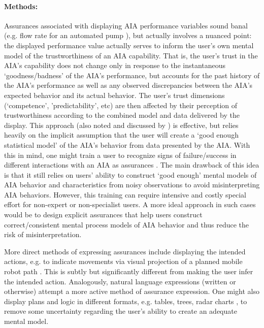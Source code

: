 \paragraph{Methods:} Assurances associated with displaying AIA performance variables sound banal (e.g. flow rate for an automated pump \cite{Muir1996-gt}), but actually involves a nuanced point: the displayed performance value actually serves to inform the user's own mental model of the trustworthiness of an AIA capability. That is, the user's trust in the AIA's capability does not change only in response to the instantaneous `goodness/badness' of the AIA's performance, but accounts for the past history of the AIA's performance as well as any observed discrepancies between the AIA's expected behavior and its actual behavior.  
The user's trust dimensions (`competence', 'predictability', etc) are then affected by their perception of trustworthiness according to the combined model and data delivered by the display. 
This approach (also noted and discussed by \cite{Wickens1999-la,Sheridan1984-kx,Hutchins2015-if}) is effective, but relies heavily on the implicit assumption that the user will create a `good enough statistical model' of the AIA's behavior from data presented by the AIA. With this in mind, one might train a user to recognize signs of failure/success in different interactions with an AIA as assurances \cite{Freedy2007-sg,Desai2012-rc,Salem2015-md}. 
The main drawback of this idea is that it still relies on users' ability to construct `good enough' mental models of AIA behavior and characteristics from noisy observations to avoid misinterpreting AIA behaviors. 
However, this training can require intensive and costly special effort for non-expert or non-specialist users. 
A more ideal approach in such cases would be to design explicit assurances that help users construct correct/consistent mental process models of AIA behavior and thus reduce the risk of misinterpretation.

More direct methods of expressing assurances include displaying the intended actions, e.g. to indicate movements via visual projection of a planned mobile robot path \cite{Chadalavada2015-wx}. This is subtly but significantly different from making the user infer the intended action. Analogously, natural language expressions (written or otherwise) attempt a more active method of assurance expression. One might also display plans and logic in different formats, e.g. tables, trees, radar charts  \cite{Van_Belle2013-ph, Huysmans2011-th, Hutchins2015-if}, to remove some uncertainty regarding the user's ability to create an adequate mental model. %

